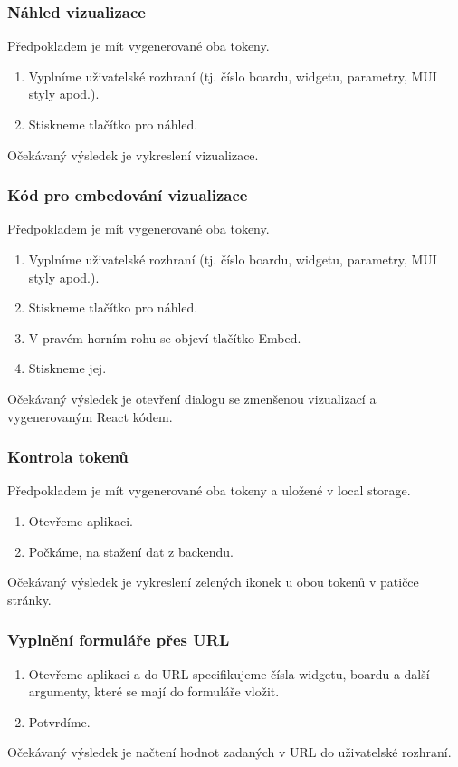 \documentclass[czech, bc, kiv, he, iso690numb]{fasthesis}
\begin{document}
\subsubsection{Náhled vizualizace}
Předpokladem je mít vygenerované oba tokeny.
\begin{enumerate}
	\item Vyplníme uživatelské rozhraní (tj. číslo boardu, widgetu, parametry, MUI styly apod.).
	\item Stiskneme tlačítko pro náhled.
\end{enumerate}
Očekávaný výsledek je vykreslení vizualizace.

\subsubsection{Kód pro embedování vizualizace}
Předpokladem je mít vygenerované oba tokeny.
\begin{enumerate}
	\item Vyplníme uživatelské rozhraní (tj. číslo boardu, widgetu, parametry, MUI styly apod.).
	\item Stiskneme tlačítko pro náhled.
	\item V pravém horním rohu se objeví tlačítko Embed.
	\item Stiskneme jej.
\end{enumerate}
Očekávaný výsledek je otevření dialogu se zmenšenou vizualizací a vygenerovaným React kódem.

\subsubsection{Kontrola tokenů}
Předpokladem je mít vygenerované oba tokeny a uložené v local storage.

\begin{enumerate}
	\item Otevřeme aplikaci.
	\item Počkáme, na stažení dat z backendu.
\end{enumerate}
Očekávaný výsledek je vykreslení zelených ikonek u obou tokenů v patičce stránky.

\subsubsection{Vyplnění formuláře přes URL}

\begin{enumerate}
	\item Otevřeme aplikaci a do URL specifikujeme čísla widgetu, boardu a další argumenty, které se mají do formuláře vložit.
	\item Potvrdíme.
\end{enumerate}
Očekávaný výsledek je načtení hodnot zadaných v URL do uživatelské rozhraní.
\end{document}
